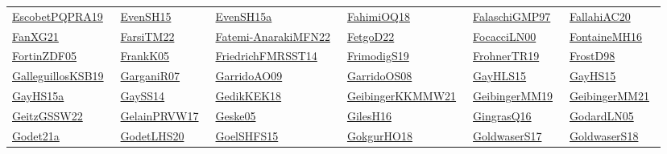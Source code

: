 \begin{longtable}{*{6}{l}}
\href{works/EscobetPQPRA19.pdf}{EscobetPQPRA19}~\cite{EscobetPQPRA19} & \href{works/EvenSH15.pdf}{EvenSH15}~\cite{EvenSH15} & \href{works/EvenSH15a.pdf}{EvenSH15a}~\cite{EvenSH15a} & \href{works/FahimiOQ18.pdf}{FahimiOQ18}~\cite{FahimiOQ18} & \href{works/FalaschiGMP97.pdf}{FalaschiGMP97}~\cite{FalaschiGMP97} & \href{works/FallahiAC20.pdf}{FallahiAC20}~\cite{FallahiAC20}\\ 
\href{works/FanXG21.pdf}{FanXG21}~\cite{FanXG21} & \href{works/FarsiTM22.pdf}{FarsiTM22}~\cite{FarsiTM22} & \href{}{Fatemi-AnarakiMFN22}~\cite{Fatemi-AnarakiMFN22} & \href{works/FetgoD22.pdf}{FetgoD22}~\cite{FetgoD22} & \href{works/FocacciLN00.pdf}{FocacciLN00}~\cite{FocacciLN00} & \href{works/FontaineMH16.pdf}{FontaineMH16}~\cite{FontaineMH16}\\ 
\href{works/FortinZDF05.pdf}{FortinZDF05}~\cite{FortinZDF05} & \href{works/FrankK05.pdf}{FrankK05}~\cite{FrankK05} & \href{}{FriedrichFMRSST14}~\cite{FriedrichFMRSST14} & \href{works/FrimodigS19.pdf}{FrimodigS19}~\cite{FrimodigS19} & \href{works/FrohnerTR19.pdf}{FrohnerTR19}~\cite{FrohnerTR19} & \href{works/FrostD98.pdf}{FrostD98}~\cite{FrostD98}\\ 
\href{works/GalleguillosKSB19.pdf}{GalleguillosKSB19}~\cite{GalleguillosKSB19} & \href{works/GarganiR07.pdf}{GarganiR07}~\cite{GarganiR07} & \href{works/GarridoAO09.pdf}{GarridoAO09}~\cite{GarridoAO09} & \href{works/GarridoOS08.pdf}{GarridoOS08}~\cite{GarridoOS08} & \href{works/GayHLS15.pdf}{GayHLS15}~\cite{GayHLS15} & \href{works/GayHS15.pdf}{GayHS15}~\cite{GayHS15}\\ 
\href{works/GayHS15a.pdf}{GayHS15a}~\cite{GayHS15a} & \href{works/GaySS14.pdf}{GaySS14}~\cite{GaySS14} & \href{works/GedikKEK18.pdf}{GedikKEK18}~\cite{GedikKEK18} & \href{works/GeibingerKKMMW21.pdf}{GeibingerKKMMW21}~\cite{GeibingerKKMMW21} & \href{works/GeibingerMM19.pdf}{GeibingerMM19}~\cite{GeibingerMM19} & \href{works/GeibingerMM21.pdf}{GeibingerMM21}~\cite{GeibingerMM21}\\ 
\href{works/GeitzGSSW22.pdf}{GeitzGSSW22}~\cite{GeitzGSSW22} & \href{works/GelainPRVW17.pdf}{GelainPRVW17}~\cite{GelainPRVW17} & \href{works/Geske05.pdf}{Geske05}~\cite{Geske05} & \href{works/GilesH16.pdf}{GilesH16}~\cite{GilesH16} & \href{works/GingrasQ16.pdf}{GingrasQ16}~\cite{GingrasQ16} & \href{works/GodardLN05.pdf}{GodardLN05}~\cite{GodardLN05}\\ 
\href{works/Godet21a.pdf}{Godet21a}~\cite{Godet21a} & \href{works/GodetLHS20.pdf}{GodetLHS20}~\cite{GodetLHS20} & \href{works/GoelSHFS15.pdf}{GoelSHFS15}~\cite{GoelSHFS15} & \href{works/GokgurHO18.pdf}{GokgurHO18}~\cite{GokgurHO18} & \href{works/GoldwaserS17.pdf}{GoldwaserS17}~\cite{GoldwaserS17} & \href{works/GoldwaserS18.pdf}{GoldwaserS18}~\cite{GoldwaserS18}\\ 

\end{longtable}
